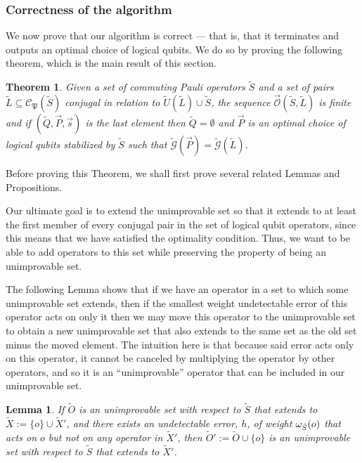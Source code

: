 \documentclass[twocolumn,showpacs,preprintnumbers,amsmath,amssymb,nofootinbib,pra,floatfix]{revtex4-1}
\newtheorem{theorem}{Theorem}
\newtheorem{lemma}{Lemma}
\newenvironment{remark}[1][Remark]{\begin{trivlist}
\item[\hskip \labelsep {\bfseries #1}]}{\end{trivlist}}
\newcommand{\lst}{\vec}
\newcommand{\set}{\tilde}
\newcommand{\genfun}{\tilde{\mathcal{G}}}
\newcommand{\pauligroup}{\mathfrak{P}}
\newcommand{\centralizer}{\mathcal{C}}
\newcommand{\optimizer}{\lst{\mathcal{O}}}
\begin{document}
\subsubsection{Correctness of the algorithm}

We now prove that our algorithm is correct --- that is, that it terminates and outputs an optimal choice of logical qubits.  We do so by proving the following theorem, which is the main result of this section.

\begin{theorem}
\label{theorem:algorithm is correct}
Given a set of commuting Pauli operators $\set S$ and a set of pairs $\set L\subseteq\centralizer_\pauligroup(\set S)$ conjugal in relation to $\set U(\set L)\cup\set S$, the sequence $\optimizer(\set S,\set L)$ is finite and if $(\set Q,\lst P,\lst s)$ is the last element then $\set Q=\emptyset$ and $\lst P$ is an optimal choice of logical qubits stabilized by $\set S$ such that $\genfun(\lst P)=\genfun(\set L)$.
\end{theorem}
\begin{remark}
Before proving this Theorem, we shall first prove several related Lemmas and Propositions.

Our ultimate goal is to extend the unimprovable set so that it extends to at least the first member of every conjugal pair in the set of logical qubit operators, since this means that we have satisfied the optimality condition.  Thus, we want to be able to add operators to this set while preserving the property of being an unimprovable set.

The following Lemma shows that if we have an operator in a set to which some unimprovable set extends, then if the smallest weight undetectable error of this operator acts on only it then we may move this operator to the unimprovable set to obtain a new unimprovable set that also extends to the same set as the old set minus the moved element.  The intuition here is that because said error acts only on this operator, it cannot be canceled by multiplying the operator by other operators, and so it is an ``unimprovable'' operator that can be included in our unimprovable set.
\end{remark}

\begin{lemma}
\label{lemma:move-it-over}
If $\set O$ is an unimprovable set with respect to $\set S$ that extends to $\set X:=\{o\}\cup\set X'$, and there exists an undetectable error, $h$, of weight $\om_{\set S}(o)$ that acts on $o$ but not on any operator in $\set X'$, then $\set O':=\set O\cup\{o\}$ is an unimprovable set with respect to $\set S$ that extends to $\set X'$.
\end{lemma}
\end{document}
